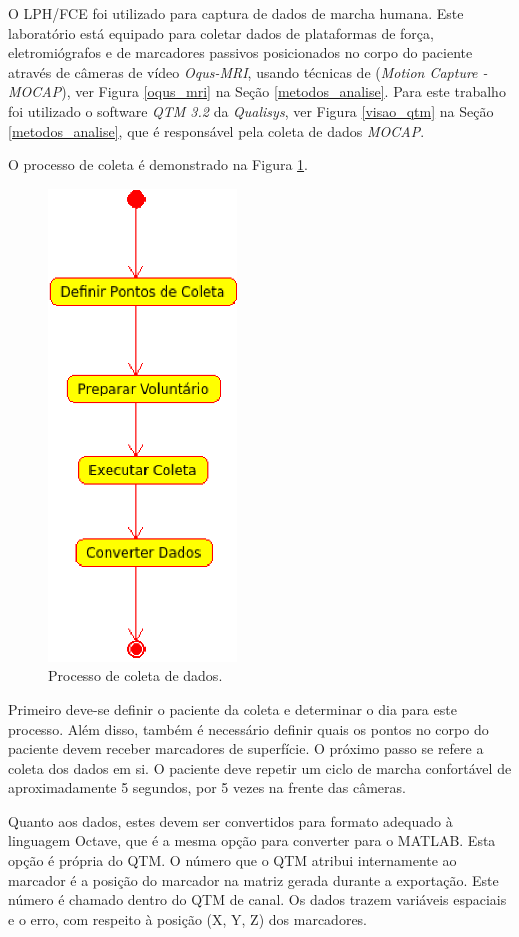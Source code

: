 O LPH/FCE foi utilizado para captura de dados de marcha humana. 
Este laboratório está equipado para coletar dados de plataformas de força, eletromiógrafos e de marcadores passivos posicionados no corpo do paciente através de câmeras de vídeo \emph{Oqus-MRI}, usando técnicas de (\emph{Motion Capture - MOCAP}), ver Figura \ref{oqus_mri} na Seção \ref{metodos_analise}. 
Para este trabalho foi utilizado o software \emph{QTM 3.2} da \emph{Qualisys}, ver Figura \ref{visao_qtm} na Seção \ref{metodos_analise}, que é responsável pela coleta de dados \emph{MOCAP}. 

O processo de coleta é demonstrado na Figura \ref{coleta}.

\begin{figure}[ht]
	\centering
	\includegraphics[width=5cm]{figuras/coleta.eps}
	\caption{Processo de coleta de dados.}
	\label{coleta}
\end{figure}

Primeiro deve-se definir o paciente da coleta e determinar o dia para este processo. 
Além disso, também é necessário definir quais os pontos no corpo do paciente devem receber marcadores de superfície. 
O próximo passo se refere a coleta dos dados em si. 
O paciente deve repetir um ciclo de marcha confortável de aproximadamente 5 segundos, por 5 vezes na frente das câmeras.

Quanto aos dados, estes devem ser convertidos para formato adequado à linguagem Octave, que é a mesma opção para converter para o MATLAB. 
Esta opção é própria do QTM. 
O número que o QTM atribui internamente ao marcador é a posição do marcador na matriz gerada durante a exportação. Este número é chamado dentro do QTM de canal. Os dados trazem variáveis espaciais e o erro, com respeito à posição (X, Y, Z) dos marcadores.

